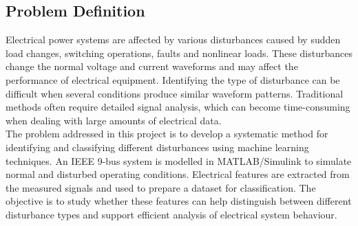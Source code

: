 \documentclass[12pt]{article}
\begin{document}
\begin{center}
\subsection{Problem Definition}
\raggedright
\justifying
Electrical power systems are affected by various disturbances caused by sudden load changes, switching operations, faults and nonlinear loads. These disturbances change the normal voltage and current waveforms and may affect the performance of electrical equipment. Identifying the type of disturbance can be difficult when several conditions produce similar waveform patterns. Traditional methods often require detailed signal analysis, which can become time-consuming when dealing with large amounts of electrical data.\\

The problem addressed in this project is to develop a systematic method for identifying and classifying different disturbances using machine learning techniques. An IEEE 9-bus system is modelled in MATLAB/Simulink to simulate normal and disturbed operating conditions. Electrical features are extracted from the measured signals and used to prepare a dataset for classification. The objective is to study whether these features can help distinguish between different disturbance types and support efficient analysis of electrical system behaviour.

 

\end{center}
\end{document}
